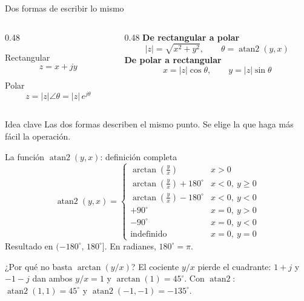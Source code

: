 \documentclass[aspectratio=169,11pt]{beamer}
\begin{document}
\begin{frame}{Dos formas de escribir lo mismo}
  \begin{columns}[T]
    \begin{column}{0.48\textwidth}
      \begin{block}{Rectangular}
        \[ z = x + jy \]
      \end{block}
      \begin{block}{Polar}
        \[ z = |z|\angle\theta = |z|\,e^{j\theta} \]
      \end{block}
    \end{column}
    \begin{column}{0.48\textwidth}
      \textbf{De rectangular a polar}
      \[
        |z| = \sqrt{x^2+y^2}, \qquad
        \theta = \operatorname{atan2}(y,x)
      \]
      \textbf{De polar a rectangular}
      \[
        x = |z|\cos\theta, \qquad y = |z|\sin\theta
      \]
    \end{column}
  \end{columns}
  \vspace{6pt}
  \begin{alertblock}{Idea clave}
    Las dos formas describen el mismo punto. Se elige la que haga más fácil la operación.
  \end{alertblock}
\end{frame}

\begin{frame}{La función $\operatorname{atan2}(y,x)$: definición completa}
  \small
  \[
    \operatorname{atan2}(y,x)=
    \begin{cases}
      \arctan\!\left(\tfrac{y}{x}\right) & x>0\\[3pt]
      \arctan\!\left(\tfrac{y}{x}\right)+180^\circ & x<0,\ y\ge 0\\[3pt]
      \arctan\!\left(\tfrac{y}{x}\right)-180^\circ & x<0,\ y<0\\[3pt]
      +90^\circ & x=0,\ y>0\\[1pt]
      -90^\circ & x=0,\ y<0\\[1pt]
      \text{indefinido} & x=0,\ y=0
    \end{cases}
  \]
  Resultado en $(-180^\circ,\,180^\circ]$. En radianes, $180^\circ=\pi$.

  \begin{alertblock}{¿Por qué no basta $\arctan(y/x)$?}
    El cociente $y/x$ pierde el cuadrante: $1+j$ y $-1-j$ dan ambos $y/x=1$ y $\arctan(1)=45^\circ$.
    Con $\operatorname{atan2}$: $\operatorname{atan2}(1,1)=45^\circ$ y $\operatorname{atan2}(-1,-1)=-135^\circ$.
  \end{alertblock}
\end{frame}
\end{document}
